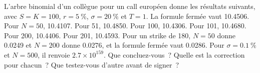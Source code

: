 \begin{question}\label{iq:iv2:risk-validation-and-regulation:40}
L'arbre binomial d'un collègue pour un call européen donne les résultats suivants, avec $S = K = 100$, $r = 5~\%$, $\sigma = 20~\%$ et $T = 1$. La formule fermée vaut 10.4506. Pour $N = 50$, 10.4107. Pour 51, 10.4850. Pour 100, 10.4306. Pour 101, 10.4680. Pour 200, 10.4406. Pour 201, 10.4593. Pour un strike de 180, $N = 50$ donne 0.0249 et $N = 200$ donne 0.0276, et la formule fermée vaut 0.0286. Pour $\sigma = 0.1~\%$ et $N = 500$, il renvoie $2.7 \times 10^{159}$. Que concluez-vous~? Quelle est la correction pour chacun~? Que testez-vous d'autre avant de signer~?
\end{question}
